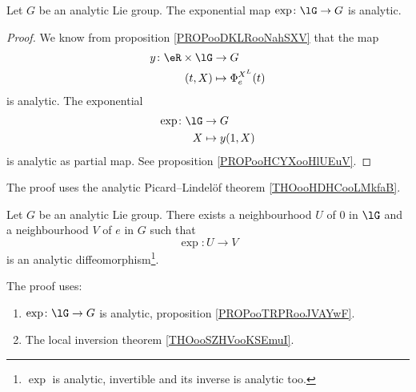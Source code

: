 \begin{proposition}       \label{PROPooTRPRooJVAYwF}
	Let \( G\) be an analytic Lie group. The exponential map \( \exp\colon \lG\to G\) is analytic.
\end{proposition}

\begin{proof}
	We know from proposition \ref{PROPooDKLRooNahSXV} that the map
	\begin{equation}
		\begin{aligned}
			y\colon \eR\times \lG & \to G                   \\
			(t,X)                 & \mapsto \Phi_e^{X^L}(t)
		\end{aligned}
	\end{equation}
	is analytic. The exponential
	\begin{equation}
		\begin{aligned}
			\exp\colon \lG & \to G          \\
			X              & \mapsto y(1,X)
		\end{aligned}
	\end{equation}
	is analytic as partial map. See proposition \ref{PROPooHCYXooHlUEuV}.
\end{proof}

The proof uses the analytic Picard–Lindelöf theorem \ref{THOooHDHCooLMkfaB}.

\begin{theorem}     \label{THOooFMFLooCnLJPr}
	Let \( G\) be an analytic Lie group. There exists a neighbourhood \( U\) of \( 0\) in \( \lG\) and a neighbourhood \( V\) of \( e\) in \( G\) such that
	\begin{equation}
		\exp\colon U\to V
	\end{equation}
	is an analytic diffeomorphism\footnote{\( \exp\) is analytic, invertible and its inverse is analytic too.}.
\end{theorem}

The proof uses:
\begin{enumerate}
	\item
	      \(\exp \colon \lG\to G  \) is analytic, proposition \ref{PROPooTRPRooJVAYwF}.
	\item
	      The local inversion theorem \ref{THOooSZHVooKSEmuI}.
\end{enumerate}



